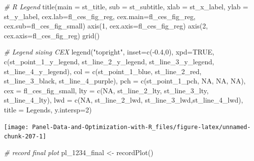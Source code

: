 \documentclass[
]{book}
\newenvironment{Shaded}{\begin{snugshade}}{\end{snugshade}}
\newcommand{\AttributeTok}[1]{\textcolor[rgb]{0.77,0.63,0.00}{#1}}
\newcommand{\CommentTok}[1]{\textcolor[rgb]{0.56,0.35,0.01}{\textit{#1}}}
\newcommand{\ConstantTok}[1]{\textcolor[rgb]{0.00,0.00,0.00}{#1}}
\newcommand{\DecValTok}[1]{\textcolor[rgb]{0.00,0.00,0.81}{#1}}
\newcommand{\FloatTok}[1]{\textcolor[rgb]{0.00,0.00,0.81}{#1}}
\newcommand{\FunctionTok}[1]{\textcolor[rgb]{0.00,0.00,0.00}{#1}}
\newcommand{\NormalTok}[1]{#1}
\newcommand{\OtherTok}[1]{\textcolor[rgb]{0.56,0.35,0.01}{#1}}
\newcommand{\SpecialCharTok}[1]{\textcolor[rgb]{0.00,0.00,0.00}{#1}}
\newcommand{\StringTok}[1]{\textcolor[rgb]{0.31,0.60,0.02}{#1}}
\begin{document}
\begin{Shaded}
\begin{Highlighting}[]
\CommentTok{\# R Legend}
\FunctionTok{title}\NormalTok{(}\AttributeTok{main =}\NormalTok{ st\_title, }\AttributeTok{sub =}\NormalTok{ st\_subtitle, }\AttributeTok{xlab =}\NormalTok{ st\_x\_label, }\AttributeTok{ylab =}\NormalTok{ st\_y\_label,}
      \AttributeTok{cex.lab=}\NormalTok{fl\_ces\_fig\_reg,}
      \AttributeTok{cex.main=}\NormalTok{fl\_ces\_fig\_reg,}
      \AttributeTok{cex.sub=}\NormalTok{fl\_ces\_fig\_small)}
\FunctionTok{axis}\NormalTok{(}\DecValTok{1}\NormalTok{, }\AttributeTok{cex.axis=}\NormalTok{fl\_ces\_fig\_reg)}
\FunctionTok{axis}\NormalTok{(}\DecValTok{2}\NormalTok{, }\AttributeTok{cex.axis=}\NormalTok{fl\_ces\_fig\_reg)}
\FunctionTok{grid}\NormalTok{()}

\CommentTok{\# Legend sizing CEX}
\FunctionTok{legend}\NormalTok{(}\StringTok{"topright"}\NormalTok{,}
       \AttributeTok{inset=}\FunctionTok{c}\NormalTok{(}\SpecialCharTok{{-}}\FloatTok{0.4}\NormalTok{,}\DecValTok{0}\NormalTok{),}
       \AttributeTok{xpd=}\ConstantTok{TRUE}\NormalTok{,}
       \FunctionTok{c}\NormalTok{(st\_point\_1\_y\_legend, st\_line\_2\_y\_legend, st\_line\_3\_y\_legend, st\_line\_4\_y\_legend),}
       \AttributeTok{col =} \FunctionTok{c}\NormalTok{(st\_point\_1\_blue, st\_line\_2\_red, st\_line\_3\_black, st\_line\_4\_purple),}
       \AttributeTok{pch =} \FunctionTok{c}\NormalTok{(st\_point\_1\_pch, }\ConstantTok{NA}\NormalTok{, }\ConstantTok{NA}\NormalTok{, }\ConstantTok{NA}\NormalTok{),}
       \AttributeTok{cex =}\NormalTok{ fl\_ces\_fig\_small,}
       \AttributeTok{lty =} \FunctionTok{c}\NormalTok{(}\ConstantTok{NA}\NormalTok{, st\_line\_2\_lty, st\_line\_3\_lty, st\_line\_4\_lty),}
       \AttributeTok{lwd =} \FunctionTok{c}\NormalTok{(}\ConstantTok{NA}\NormalTok{, st\_line\_2\_lwd, st\_line\_3\_lwd,st\_line\_4\_lwd),}
       \AttributeTok{title =} \StringTok{\textquotesingle{}Legends\textquotesingle{}}\NormalTok{,}
       \AttributeTok{y.intersp=}\DecValTok{2}\NormalTok{)}
\end{Highlighting}
\end{Shaded}

\begin{center}\texttt{[image: Panel-Data-and-Optimization-with-R\_files/figure-latex/unnamed-chunk-207-1]} \end{center}

\begin{Shaded}
\begin{Highlighting}[]
\CommentTok{\# record final plot}
\NormalTok{pl\_1234\_final }\OtherTok{\textless{}{-}} \FunctionTok{recordPlot}\NormalTok{()}
\end{Highlighting}
\end{Shaded}
\end{document}
